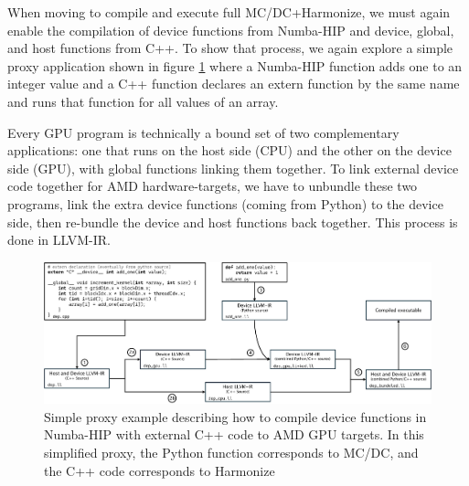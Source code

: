 When moving to compile and execute full MC/DC+Harmonize, we must again enable the compilation of device functions from Numba-HIP and device, global, and host functions from C++.
To show that process, we again explore a simple proxy application shown in figure \ref{fig:codeclang} where a Numba-HIP function adds one to an integer value and a C++ function declares an extern function by the same name and runs that function for all values of an array.

Every GPU program is technically a bound set of two complementary applications: one that runs on the host side (CPU) and the other on the device side (GPU), with global functions linking them together.
To link external device code together for AMD hardware-targets, we have to unbundle these two programs, link the extra device functions (coming from Python) to the device side, then re-bundle the device and host functions back together.
This process is done in LLVM-IR.

\begin{figure}[]
  \centering
  \includegraphics[width=\textwidth]{appendix/mcdc_prof_figs/flowclang.pdf}
  \caption{Simple proxy example describing how to compile device functions in Numba-HIP with external C++ code to AMD GPU targets. In this simplified proxy, the Python function corresponds to MC/DC, and the C++ code corresponds to Harmonize}
  \label{fig:codeclang}
\end{figure}

